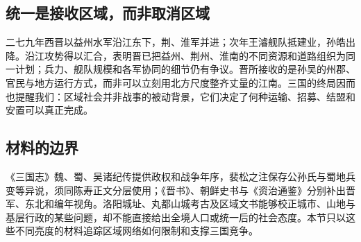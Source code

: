 \subsection{统一是接收区域，而非取消区域}

二七九年西晋以益州水军沿江东下，荆、淮军并进；次年王濬舰队抵建业，孙皓出降。沿江攻势得以汇合，表明晋已把益州、荆州、淮南的不同资源和道路组织为同一计划；兵力、舰队规模和各军协同的细节仍有争议。晋所接收的是孙吴的州郡、官民与地方运行方式，而非可以立刻用北方尺度整齐丈量的江南。三国的终局因而也提醒我们：区域社会并非战事的被动背景，它们决定了何种运输、招募、结盟和安置可以真正完成。

\subsection{材料的边界}

《三国志》魏、蜀、吴诸纪传提供政权和战争年序，裴松之注保存公孙氏与蜀地兵变等异说，须同陈寿正文分层使用；《晋书》、朝鲜史书与《资治通鉴》分别补出晋军、东北和编年视角。洛阳城址、丸都山城考古及区域文书能够校正城市、山地与基层行政的某些问题，却不能直接给出全境人口或统一后的社会态度。本节只以这些不同亮度的材料追踪区域网络如何限制和支撑三国竞争。
